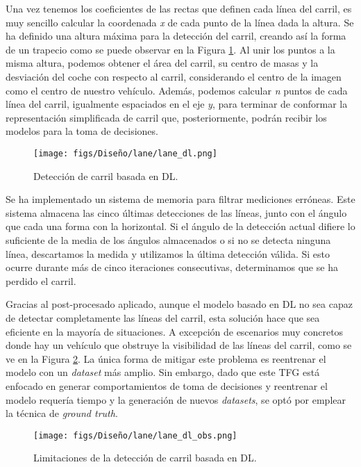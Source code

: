 Una vez tenemos los coeficientes de las rectas que definen cada línea del carril, es muy sencillo calcular la coordenada \textit{x} de cada punto de la línea dada la altura. Se ha definido una altura máxima para la detección del carril, creando así la forma de un trapecio como se puede observar en la Figura \ref{fig:dl_final_carril}. Al unir los puntos a la misma altura, podemos obtener el área del carril, su centro de masas y la desviación del coche con respecto al carril, considerando el centro de la imagen como el centro de nuestro vehículo. Además, podemos calcular \textit{n} puntos de cada línea del carril, igualmente espaciados en el eje \textit{y}, para terminar de conformar la representación simplificada de carril que, posteriormente, podrán recibir los modelos para la toma de decisiones.

\begin{figure}[ht]
\centering
\texttt{[image: figs/Diseño/lane/lane\_dl.png]}
\caption{Detección de carril basada en \ac{DL}.}
\label{fig:dl_final_carril}
\end{figure}

Se ha implementado un sistema de memoria para filtrar mediciones erróneas. Este sistema almacena las cinco últimas detecciones de las líneas, junto con el ángulo que cada una forma con la horizontal. Si el ángulo de la detección actual difiere lo suficiente de la media de los ángulos almacenados o si no se detecta ninguna línea, descartamos la medida y utilizamos la última detección válida. Si esto ocurre durante más de cinco iteraciones consecutivas, determinamos que se ha perdido el carril.

Gracias al post-procesado aplicado, aunque el modelo basado en \ac{DL} no sea capaz de detectar completamente las líneas del carril, esta solución hace que sea eficiente en la mayoría de situaciones. A excepción de escenarios muy concretos donde hay un vehículo que obstruye la visibilidad de las líneas del carril, como se ve en la Figura \ref{fig:dl_final_carril_obs}. La única forma de mitigar este problema es reentrenar el modelo con un \textit{dataset} más amplio. Sin embargo, dado que este \ac{TFG} está enfocado en generar comportamientos de toma de decisiones y reentrenar el modelo requería tiempo y la generación de nuevos \textit{datasets}, se optó por emplear la técnica de \textit{ground truth}.
\begin{figure}[ht]
\centering
\texttt{[image: figs/Diseño/lane/lane\_dl\_obs.png]}
\caption{Limitaciones de la detección de carril basada en \ac{DL}.}
\label{fig:dl_final_carril_obs}
\end{figure}

